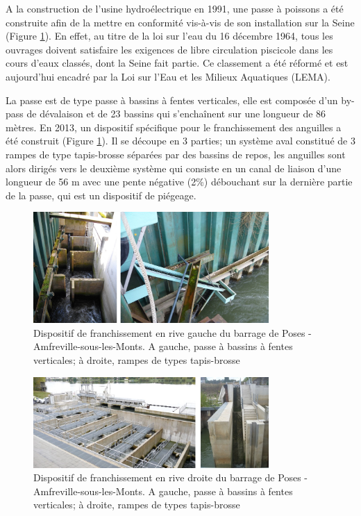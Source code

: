 \documentclass[11pt,titlepage,twoside]{article}\usepackage[]{graphicx}\usepackage[table]{xcolor}
\begin{document}
A la construction de l'usine hydroélectrique en 1991, une passe à poissons a été construite afin de la mettre en conformité vis-à-vis de son installation sur la Seine (Figure \ref{DF_rg_poses}). En effet, au titre de la loi sur l'eau du 16 décembre 1964, tous les ouvrages doivent satisfaire les exigences de libre circulation piscicole dans les cours d'eaux classés, dont la Seine fait partie. Ce classement a été réformé et est aujourd'hui encadré par la Loi sur l'Eau et les Milieux Aquatiques (LEMA).

La passe est de type passe à bassins à fentes verticales, elle est composée d'un by-pass de dévalaison et de 23 bassins qui s'enchaînent sur une longueur de 86 mètres. En 2013, un dispositif spécifique pour le franchissement des anguilles a été construit (Figure \ref{DF_rg_poses}). Il se découpe en 3 parties; un système aval constitué de 3 rampes de type \og tapis-brosse \fg{} séparées par des bassins de repos, les anguilles sont alors dirigés vers le deuxième système qui consiste en un canal de liaison d'une longueur de 56 m avec une pente négative (2\%) débouchant sur la dernière partie de la passe, qui est un dispositif de piégeage.

\begin{figure}
\centering
\includegraphics[width=0.8\textwidth]{DF_rg_poses}
\caption{Dispositif de franchissement en rive gauche du barrage de Poses - Amfreville-sous-les-Monts. A gauche, passe à bassins à fentes verticales; à droite, rampes de types \og tapis-brosse \fg{}}
\label{DF_rg_poses}
\end{figure}

\begin{figure}
\centering
\includegraphics[width=0.8\textwidth]{DF_rd_poses}
\caption{Dispositif de franchissement en rive droite du barrage de Poses - Amfreville-sous-les-Monts. A gauche, passe à bassins à fentes verticales; à droite, rampes de types \og tapis-brosse \fg{}}
\label{DF_rd_poses}
\end{figure}
\end{document}

